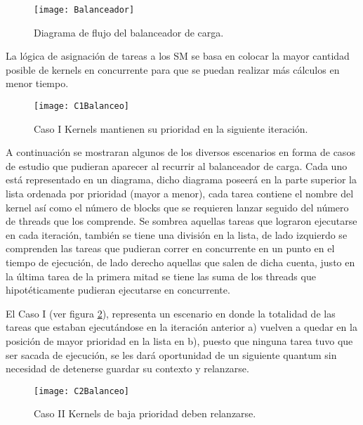     \begin{figure}[p]
      \centering
        \texttt{[image: Balanceador]}
        \caption{Diagrama de flujo del balanceador de carga.}
        \label{fig:Balanceador}
    \end{figure}

La lógica de asignación de tareas a los SM se basa en colocar la mayor cantidad posible de kernels en concurrente para que se puedan realizar más cálculos en menor tiempo.
\newline

    \begin{figure}[]
      \centering
        \texttt{[image: C1Balanceo]}
        \caption{Caso I Kernels mantienen su prioridad en la siguiente iteración.}
        \label{fig:C1Balanceo}
    \end{figure}

A continuación se mostraran algunos de los diversos escenarios en forma de casos de estudio que pudieran aparecer al recurrir al balanceador de carga. Cada uno está representado en un diagrama, dicho diagrama poseerá en la parte superior la lista ordenada por prioridad (mayor a menor), cada tarea contiene el nombre del kernel así como el número de blocks que se requieren lanzar seguido del número de threads que los comprende. Se sombrea aquellas tareas que lograron ejecutarse en cada iteración, también se tiene una división en la lista, de lado izquierdo se comprenden las tareas que pudieran correr en concurrente en un punto en el tiempo de ejecución, de lado derecho aquellas que salen de dicha cuenta, justo en la última tarea de la primera mitad se tiene las suma de los threads que hipotéticamente pudieran ejecutarse en concurrente.
\newline

El Caso I (ver figura \ref{fig:C1Balanceo}), representa un escenario en donde la totalidad de las tareas que estaban ejecutándose en la iteración anterior a) vuelven a quedar en la posición de mayor prioridad en la lista en b), puesto que ninguna tarea tuvo que ser sacada de ejecución, se les dará oportunidad de un siguiente quantum sin necesidad de detenerse guardar su contexto y relanzarse.
    \newline
    
    \begin{figure}[]
      \centering
        \texttt{[image: C2Balanceo]}
        \caption{Caso II Kernels de baja prioridad deben relanzarse.}
        \label{fig:C2Balanceo}
    \end{figure}
    
